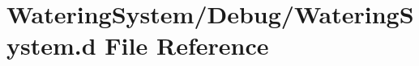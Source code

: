 \hypertarget{_watering_system_8d}{}\section{Watering\+System/\+Debug/\+Watering\+System.d File Reference}
\label{_watering_system_8d}
